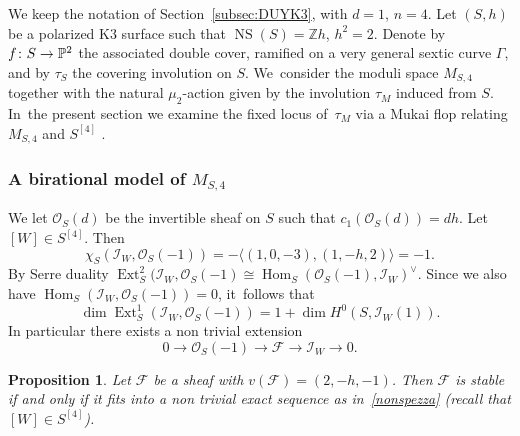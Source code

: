 \documentclass[11pt]{article}
\newcommand{\ZZ}{{\mathbb Z}}\let\Z\ZZ
\newcommand\cF{\mathcal{F}}
\newcommand\cI{\mathcal{I}}
\newcommand\cO{\mathcal{O}}
\DeclareMathOperator{\Ext}{Ext}
\DeclareMathOperator{\Hom}{Hom}
\DeclareMathOperator{\NS}{NS}
\let\la\langle
\newtheorem{prop}[lemm]{Proposition}
\theoremstyle{definition}
\begin{document}
We keep the notation of Section~\ref{subsec:DUYK3}, with $d=1$, $n=4$.
Let $(S,h)$ be a polarized K3 surface such that $\NS(S)=\ZZ h$, $h^2=2$. Denote by $f\colon S\to \P^2$ the associated double cover, ramified on a very general sextic curve $\mathsf{\Gamma}$, and by $\tau_S$ the covering involution on $S$. We~consider the moduli space $M_{S,4}$ together with the natural $\mu_2$-action given by the involution $\tau_M$ induced from $S$. In~the present section we examine the fixed locus of~$\tau_M$ via a Mukai flop relating $M_{S,4}$ and $S^{[4]}$ .

\subsubsection*{A birational model of $M_{S,4}$}

We let $\cO_S(d)$ be the invertible sheaf on $S$ such that $c_1(\cO_S(d))=dh$.
Let $[W]\in S^{[4]}$. Then
\begin{equation*}
\chi_S(\cI_W,\cO_S(-1))=-\la (1,0,-3),(1,-h,2)\rangle=-1.
\end{equation*}
By Serre duality
$\Ext^2_S(\cI_W,\cO_S(-1)\cong \Hom_S(\cO_S(-1),\cI_W)^{\vee}$. Since we also have $\Hom_S(\cI_W,\cO_S(-1))=0$, it~follows that
\begin{equation}\label{extacca}
\dim\Ext^1_S(\cI_W,\cO_S(-1))=1+\dim H^0(S,\cI_W(1)).
\end{equation}
In particular there exists a non trivial extension
\begin{equation}\label{nonspezza}
0\to\cO_S(-1)\to\cF\to \cI_W\to 0.
\end{equation}

\begin{prop}\label{prop:hirschen}
Let $\cF$ be a sheaf with $v(\cF)=(2,-h,-1)$. Then $\cF$ is stable if and only if it fits into a non trivial exact sequence as in~\eqref{nonspezza} (recall that $[W]\in S^{[4]}$).
\end{prop}
\end{document}
